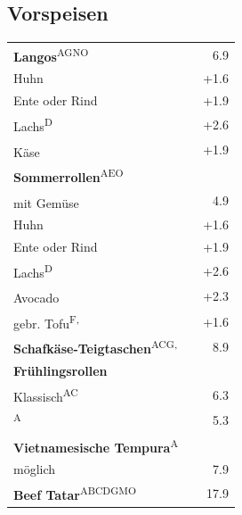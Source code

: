 \documentclass[a4paper,12pt]{article}
\newcommand{\vegan}{\textbf{\scriptsize \color{vegan}{Vegan}}}
\newcommand{\vegetarisch}{\textbf{\scriptsize \color{vegan}{Veg}}}
\begin{document}
\begin{multicols}{2}
\section*{Vorspeisen}
\begin{tabular}{Lrr}
\textbf{Langos}\textsuperscript{{\scriptsize AGNO}} & & 6.9\\
\hspace{0.4cm}Huhn & & +1.6\\
\hspace{0.4cm}Ente oder Rind & & +1.9\\
\hspace{0.4cm}Lachs\textsuperscript{{\scriptsize D}} & & +2.6\\
\hspace{0.4cm}Käse\textsuperscript{\vegetarisch} & & +1.9\vspace{0.1cm}\\
\textbf{Sommerrollen}\textsuperscript{{\scriptsize AEO}}\\
\hspace{0.4cm}mit Gemüse\textsuperscript{{\scriptsize \vegan}} & & 4.9\\
\hspace{0.4cm}Huhn & & +1.6\\
\hspace{0.4cm}Ente oder Rind & & +1.9\\
\hspace{0.4cm}Lachs\textsuperscript{{\scriptsize D}} & & +2.6\\
\hspace{0.4cm}Avocado\textsuperscript{{\scriptsize \vegan}} & & +2.3\\
\hspace{0.4cm}gebr. Tofu\textsuperscript{{\scriptsize F, \vegan}} & & +1.6\vspace{0.1cm}\\
\textbf{Schafkäse-Teigtaschen}\textsuperscript{{\scriptsize ACG, \vegetarisch}} & & 8.9\vspace{0.1cm}\\
\textbf{Frühlingsrollen}\\
\hspace{0.4cm}Klassisch\textsuperscript{{\scriptsize AC}} & & 6.3\\
\textsuperscript{{\scriptsize A}} & & 5.3\vspace{0.1cm}\\
\textbf{Vietnamesische Tempura}\textsuperscript{{\scriptsize A}}\\
\hspace{0.4cm}\scriptsize {} möglich & & 7.9\\
\textbf{Beef Tatar}\textsuperscript{{\scriptsize ABCDGMO}} & & 17.9\vspace{0.1cm}
\end{tabular}



\end{multicols}
\end{document}
